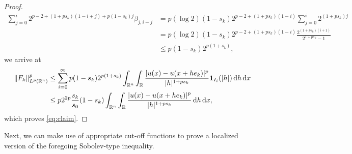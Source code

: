 \documentclass[11pt]{amsart}
\theoremstyle{plain}
\theoremstyle{definition}
\numberwithin{equation}{section}
\begin{document}
\begin{proof}
\begin{equation*}
\begin{split}
\sum_{j=0}^i 2^{p-2+(1+ps_k)(1-i+j)+p(1-s_k)j} \beta_{j,i-j} 
&= p(\log 2)(1-s_k) 2^{p-2+(1+ps_k)(1-i)} \sum_{j=0}^i 2^{(1+ps_k)j} \\
&= p(\log 2)(1-s_k) 2^{p-2+(1+ps_k)(1-i)} \frac{2^{(1+ps_k)(i+1)}}{2^{1+ps_k}-1} \\
&\leq p(1-s_k) 2^{p(1+s_k)},
\end{split}
\end{equation*}
we arrive at
\begin{equation*}
\begin{split}
\|F_k\|_{L^p(\mathbb{R}^n)}^p
&\leq \sum_{i=0}^\infty p(1-s_k)2^{p(1+s_k)} \int_{\mathbb{R}^n} \int_{\mathbb{R}} \frac{|u(x) - u(x+he_k)|^p}{|h|^{1+ps_k}} {\bf 1}_{I_i}(|h|) \,\mathrm{d}h \,\mathrm{d}x \\
&\leq p2^{2p}\frac{s_k}{s_0}(1-s_k) \int_{\mathbb{R}^n} \int_{\mathbb{R}} \frac{|u(x) - u(x+he_k)|^p}{|h|^{1+ps_k}} \,\mathrm{d}h \,\mathrm{d}x,
\end{split}
\end{equation*}
which proves \eqref{eq:claim}.
\end{proof}

Next, we can make use of appropriate cut-off functions to prove a localized version of the foregoing Sobolev-type inequality.
\end{document}

